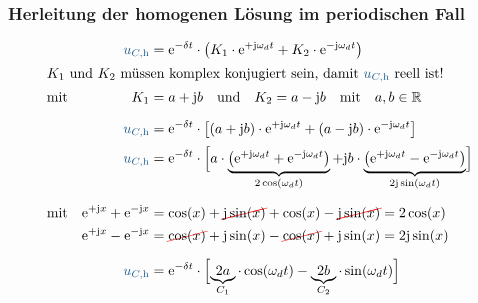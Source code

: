 \subsubsection{Herleitung der homogenen Lösung im periodischen Fall}
\label{sec:schaltvorgaengezeitbereich:exkurse:herleitung}
%
\begin{frame}[t]
\ifvmode\vspace*{-\baselineskip}\setlength{\parskip}{0ex}\fi%
\begin{align}
    &&
        \ecv{u_{C,\mathrm{h}}} &= \mathrm{e}^{-\delta t} \cdot \left( K_1 \cdot \mathrm{e}^{+\mathrm{j}\omega_d t} + K_2 \cdot \mathrm{e}^{-\mathrm{j}\omega_d t} \right) \nonumber\\
\intertext{$K_1$ und $K_2$ müssen komplex konjugiert sein, damit $\ecv{u_{C,\mathrm{h}}}$ reell ist!}
&\text{mit}&
        K_1 &= a + \mathrm{j} b \mathrlap{\quad\text{und}\quad K_2 = a - \mathrm{j} b\quad\text{mit}\quad a,b \in \mathbb{R}} \nonumber\\[6pt]
    &&
        \ecv{u_{C,\mathrm{h}}} &= \mathrm{e}^{-\delta t} \cdot \left[ (a + \mathrm{j} b) \cdot \mathrm{e}^{+\mathrm{j}\omega_d t} + (a - \mathrm{j} b) \cdot \mathrm{e}^{-\mathrm{j}\omega_d t} \right] \nonumber\\[2pt]
    &&
        \ecv{u_{C,\mathrm{h}}} &= \mathrm{e}^{-\delta t} \cdot
            \left[\vphantom{\Big|}
            \smash{ a \cdot
            \underbrace{\left(
                \mathrm{e}^{+\mathrm{j}\omega_d t} + \mathrm{e}^{-\mathrm{j}\omega_d t}
            \right)}_{2\cos(\omega_d t)}
            + \mathrm{j} b \cdot
            \underbrace{\left(
                \mathrm{e}^{+\mathrm{j}\omega_d t} - \mathrm{e}^{-\mathrm{j}\omega_d t}
            \right)}_{2\mathrm{j}\sin(\omega_d t)}
            }\right] \nonumber\\[20pt]
    &\text{mit}&
        \mathrm{e}^{+\mathrm{j}x} + \mathrm{e}^{-\mathrm{j}x} &= \cos(x) + \redcancel{\mathrm{j}\sin(x)} + \cos(x) - \redcancel{\mathrm{j}\sin(x)} = 2\cos(x) \nonumber\\
    &&
        \mathrm{e}^{+\mathrm{j}x} - \mathrm{e}^{-\mathrm{j}x} &= \redcancel{\cos(x)} + \mathrm{j}\sin(x) - \redcancel{\cos(x)} + \mathrm{j}\sin(x) = 2\mathrm{j}\sin(x) \nonumber\\[6pt]
    &&
        \ecv{u_{C,\mathrm{h}}} &= \mathrm{e}^{-\delta t} \cdot
            \left[\vphantom{\Big|}\smash{
            \underbrace{2a}_{C_1} \cdot \cos(\omega_d t) - \underbrace{2b}_{C_2} \cdot \sin(\omega_d t)
            }\right]
    \label{eq:dgl:rlc:homolsg:periodisch:herleitung}
\end{align}%
\end{frame}%

